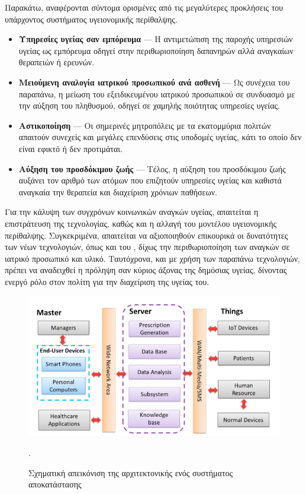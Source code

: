 Παρακάτω, αναφέρονται σύντομα ορισμένες από τις μεγαλύτερες προκλήσεις του υπάρχοντος συστήματος υγειονομικής περίθαλψης.
\begin{itemize}
    \item \textbf{Υπηρεσίες υγείας σαν εμπόρευμα} --- Η αντιμετώπιση της παροχής υπηρεσιών υγείας ως εμπόρευμα οδηγεί στην περιθωριοποίηση δαπανηρών αλλά αναγκαίων θεραπειών ή ερευνών.
    \item \textbf{Μειούμενη αναλογία ιατρικού προσωπικού ανά ασθενή} --- Ως συνέχεια του παραπάνω, η μείωση του εξειδικευμένου ιατρικού προσωπικού σε συνδυασμό με την αύξηση του πληθυσμού, οδηγεί σε χαμηλής ποιότητας υπηρεσίες υγείας.
    \item \textbf{Αστικοποίηση} --- Οι σημερινές μητροπόλεις με τα εκατομμύρια πολιτών απαιτούν συνεχείς και μεγάλες επενδύσεις στις υποδομές υγείας, κάτι το οποίο δεν είναι εφικτό ή δεν προτιμάται.
    \item \textbf{Αύξηση του προσδόκιμου ζωής} --- Τέλος, η αύξηση του προσδόκιμου ζωής αυξάνει τον αριθμό των ατόμων που επιζητούν υπηρεσίες υγείας και καθιστά αναγκαία την θεραπεία και διαχείριση χρόνιων παθήσεων.
\end{itemize}
Για την κάλυψη των συγχρόνων κοινωνικών αναγκών υγείας, απαιτείται η επιστράτευση της τεχνολογίας, καθώς και η αλλαγή του μοντέλου υγειονομικής περίθαλψης.
Συγκεκριμένα, απαιτείται να αξιοποιηθούν επικουρικά οι δυνατότητες των νέων τεχνολογιών, όπως και του , δίχως την περιθωριοποίηση των αναγκών σε ιατρικό προσωπικό και υλικό.
Ταυτόχρονα, και με χρήση των παραπάνω τεχνολογιών, πρέπει να αναδειχθεί η πρόληψη σαν κύριος άξονας της δημόσιας υγείας, δίνοντας ενεργό ρόλο στον πολίτη για την διαχείριση της υγείας του.
\begin{figure}[h!]
\includegraphics[scale=1]{images/iot_h_example.png}
\centering
\caption{Σχηματική απεικόνιση της αρχιτεκτονικής ενός  συστήματος αποκατάστασης \cite{iot_h_example}}.
\label{iot_h_example}
\end{figure}
